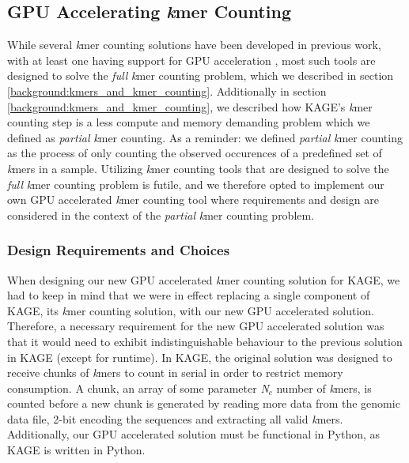 \subsection{GPU Accelerating \textit{k}mer Counting}
While several \textit{k}mer counting solutions have been developed in previous work, with at least one having support for GPU acceleration \cite{kmer_counting_tools}, most such tools are designed to solve the \textit{full} \textit{k}mer counting problem, which we described in section \ref{background:kmers_and_kmer_counting}.
Additionally in section \ref{background:kmers_and_kmer_counting}, we described how KAGE's \textit{k}mer counting step is a less compute and memory demanding problem which we defined as \textit{partial} \textit{k}mer counting.
As a reminder: we defined \textit{partial} \textit{k}mer counting as the process of only counting the observed occurences of a predefined set of \textit{k}mers in a sample.
Utilizing \textit{k}mer counting tools that are designed to solve the \textit{full} \textit{k}mer counting problem is futile, and we therefore opted to implement our own GPU accelerated \textit{k}mer counting tool where requirements and design are considered in the context of the \textit{partial} \textit{k}mer counting problem.

\subsubsection{Design Requirements and Choices}
When designing our new GPU accelerated \textit{k}mer counting solution for KAGE, we had to keep in mind that we were in effect replacing a single component of KAGE, its \textit{k}mer counting solution, with our new GPU accelerated solution.
Therefore, a necessary requirement for the new GPU accelerated solution was that it would need to exhibit indistinguishable behaviour to the previous solution in KAGE (except for runtime).
In KAGE, the original solution was designed to receive chunks of \textit{k}mers to count in serial in order to restrict memory consumption.
A chunk, an array of some parameter \textit{N$_c$} number of \textit{k}mers, is counted before a new chunk is generated by reading more data from the genomic data file, 2-bit encoding the sequences and extracting all valid \textit{k}mers.
Additionally, our GPU accelerated solution must be functional in Python, as KAGE is written in Python.

